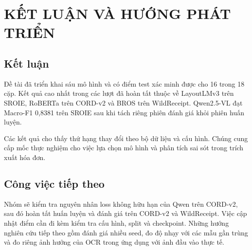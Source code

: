 \chapter{KẾT LUẬN VÀ HƯỚNG PHÁT TRIỂN}
\section{Kết luận}
Đề tài đã triển khai sáu mô hình và có điểm test xác minh được cho 16 trong 18 cặp. Kết quả cao nhất trong các lượt đã hoàn tất thuộc về LayoutLMv3 trên SROIE, RoBERTa trên CORD-v2 và BROS trên WildReceipt. Qwen2.5-VL đạt Macro-F1 0,8381 trên SROIE sau khi tách riêng phiên đánh giá khỏi phiên huấn luyện.

Các kết quả cho thấy thứ hạng thay đổi theo bộ dữ liệu và cấu hình. Chúng cung cấp mốc thực nghiệm cho việc lựa chọn mô hình và phân tích sai sót trong trích xuất hóa đơn.

\section{Công việc tiếp theo}
Nhóm sẽ kiểm tra nguyên nhân loss không hữu hạn của Qwen trên CORD-v2, sau đó hoàn tất huấn luyện và đánh giá trên CORD-v2 và WildReceipt. Việc cập nhật điểm cần đi kèm kiểm tra cấu hình, split và checkpoint. Những hướng nghiên cứu tiếp theo gồm đánh giá nhiều seed, đo độ nhạy với các mẫu gần trùng và đo riêng ảnh hưởng của OCR trong ứng dụng với ảnh đầu vào thực tế.

